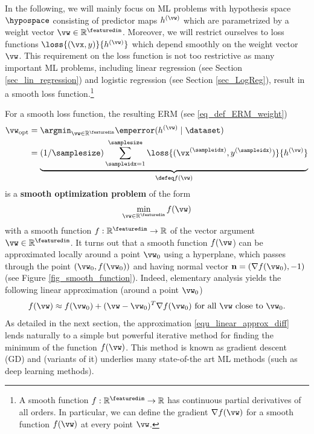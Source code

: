 \documentclass[12pt]{report}
\begin{document}
In the following, we will mainly focus on ML problems with hypothesis space $\hypospace$ consisting of predictor 
maps $h^{(\vw)}$ which are parametrized by a weight vector $\vw \in \mathbb{R}^{\featuredim}$. Moreover, we 
will restrict ourselves to loss functions $\loss{(\vx,y)}{h^{(\vw)}}$ which depend smoothly on the weight vector $\vw$. 
This requirement on the loss function is not too restrictive as many important ML problems, including linear regression 
(see Section \ref{sec_lin_regression}) and logistic regression (see Section \ref{sec_LogReg}), result in a smooth loss 
function.\footnote{A smooth function $f: \mathbb{R}^{\featuredim} \rightarrow \mathbb{R}$ has continuous partial 
derivatives of all orders. In particular, we can define the gradient $\nabla f(\vw)$ for a smooth function $f(\vw)$ 
at every point $\vw$.}

For a smooth loss function, the resulting ERM (see \eqref{eq_def_ERM_weight})  
\begin{align}
\label{equ_def_ERM_continous}
\vw_{\rm opt} & = \argmin_{\vw \in \mathbb{R}^{\featuredim}}  \emperror( h^{(\vw)} \mid \dataset)  \nonumber \\
& = \underbrace{(1/\samplesize) \sum_{\sampleidx=1}^{\samplesize} \loss{(\vx^{(\sampleidx)},y^{(\sampleidx)})}{h^{(\vw)}}}_{\defeq f(\vw)} 
\end{align} 
is a {\bf smooth optimization problem} of the form 
\begin{equation}
\label{equ_generic_smooth_problem}
\min_{\vw \in \mathbb{R}^{\featuredim}} f(\vw)
\end{equation} 
with a smooth function $f: \mathbb{R}^{\featuredim} \rightarrow \mathbb{R}$ of the vector argument $\vw \in \mathbb{R}^{\featuredim}$. 
It turns out that a smooth function $f(\vw$) can be approximated locally around a point $\vw_{0}$ using a hyperplane, which passes through the point 
$(\vw_{0},f(\vw_{0}))$ and having normal vector $\mathbf{n} = (\nabla f(\vw_{0}),-1)$ (see Figure \ref{fig_smooth_function}). 
Indeed, elementary analysis yields the following linear approximation (around a point $\vw_{0}$) \cite{RudinBookPrinciplesMatheAnalysis}
\begin{equation} 
\label{equ_linear_approx_diff}
f(\vw) \approx f(\vw_{0}) + (\vw-\vw_{0})^{T} \nabla f(\vw_{0}) \mbox{ for  all }\vw \mbox{ close to } \vw_{0}.
\end{equation}  
As detailed in the next section, the approximation \eqref{equ_linear_approx_diff} lends naturally to a simple but powerful iterative method for finding the 
minimum of the function $f(\vw)$. This method is known as gradient descent (GD) and (variants of it) underlies many state-of-the 
art ML methods (such as deep learning methods). 
\end{document}
